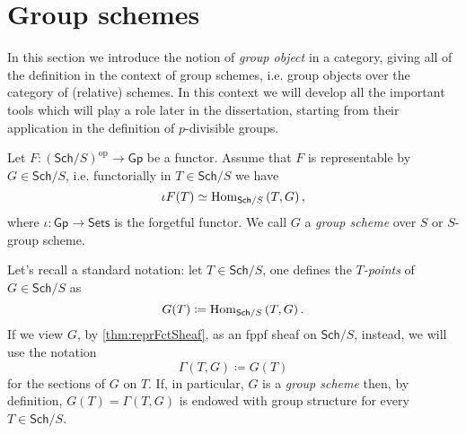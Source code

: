 \section{Group schemes}
In this section we introduce the notion of \emph{group object}
in a category, giving all of the definition in the context
of group schemes, i.e. group objects over the category of (relative) schemes.
In this context we will develop all the important tools which will play a role
later in the dissertation, starting from their application in the definition of
$p$-divisible groups.


\begin{defn}
	Let $F\colon (\mathsf{Sch}/S)^{\mathrm{op}} \to \mathsf{Gp}$ be a functor.
	Assume that $F$ is representable by $G \in \mathsf{Sch}/S$, i.e. 
	functorially in $T \in \mathsf{Sch}/S$ we have
	\begin{equation*}
		\iota F(T) \simeq \operatorname{Hom}_{\mathsf{Sch}/S} \left( T, G \right)
	,\end{equation*} 
	where $\iota\colon \mathsf{Gp} \to \mathsf{Sets}$ is the forgetful functor.
	We call $G$ a \emph{group scheme} over $S$
	or $S$-group scheme.
\end{defn}


\begin{rem}
	Let's recall a standard notation: let $T \in \mathsf{Sch}/S$, one defines
	the \emph{$T$-points} of $G \in \mathsf{Sch}/S$ as
	\begin{equation*}
		G(T) \coloneqq \operatorname{Hom}_{\mathsf{Sch}/S} \left( T, G \right)
	.\end{equation*} 
	If we view $G$, by \cref{thm:reprFctSheaf}, as an fppf sheaf on $\mathsf{Sch}/S$, instead,
	we will use the notation
	\begin{equation*}
		\Gamma \left( T, G \right) \coloneqq G(T)
	\end{equation*}
	for the sections of $G$ on $T$.
	If, in particular, $G$ is a \emph{group scheme} then, by definition,
	$G(T) = \Gamma(T,G)$ is endowed with group structure for every $T \in \mathsf{Sch}/S$.
\end{rem}


